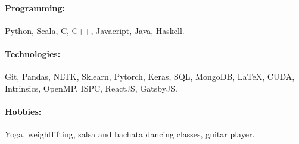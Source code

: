 \documentclass[]{resume-openfont}
\begin{document}
\paragraph{Programming:}{Python, Scala, C, C++, Javacript, Java, Haskell.} \\
\paragraph{Technologies:}{Git, Pandas, NLTK, Sklearn, Pytorch, Keras, SQL,
MongoDB, \LaTeX, CUDA, Intrinsics, OpenMP, ISPC, ReactJS, GatsbyJS.} \\
\paragraph{Hobbies:}{Yoga, weightlifting, salsa and bachata dancing classes,
guitar player.}

\sectionsep
\end{document}
